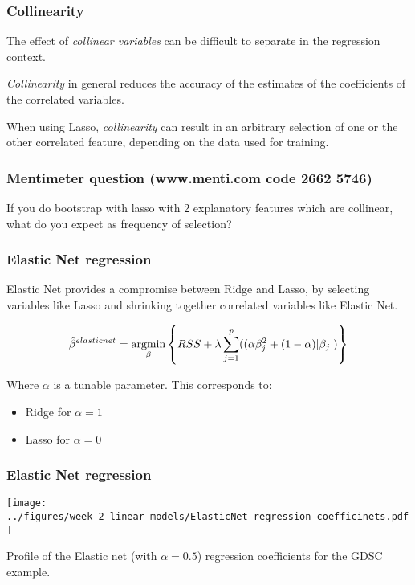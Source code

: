 \documentclass[notes]{beamer}          %
\newcommand{\argmin}{\operatornamewithlimits{argmin}}
\begin{document}
\begin{frame}
\frametitle{Collinearity}
The effect of \textit{collinear variables} can be difficult to separate in the regression context.

\vspace{5mm} 

\textit{Collinearity} in general reduces the accuracy of the estimates of the coefficients of the correlated variables.

\vspace{5mm} 

When using Lasso, \textit{collinearity} can result in an arbitrary selection of one or the other correlated feature, depending on the data used for training.
\end{frame}

\begin{frame}
\frametitle{Mentimeter question (www.menti.com code 2662 5746)}

If you do bootstrap with lasso with 2 explanatory features which are collinear, what do you expect as frequency of selection?

\end{frame}

\begin{frame}
\frametitle{Elastic Net regression}

Elastic Net provides a compromise between Ridge and Lasso, by selecting variables like Lasso and shrinking together correlated variables like Elastic Net.


\begin{equation*}
    \hat{\beta}^{elastic net} =  \argmin_{\beta} \left\{ RSS + \lambda \sum_{j=1}^p ((\alpha \beta_j^2 + (1-\alpha)| \beta_j |) \right\}
\end{equation*}

Where $\alpha$ is a tunable parameter. This corresponds to:

\begin{itemize}
    \item Ridge for $\alpha=1$
    \item Lasso for $\alpha=0$
\end{itemize}

\end{frame}

\begin{frame}
\frametitle{Elastic Net regression}

\begin{center}
\texttt{[image: ../figures/week\_2\_linear\_models/ElasticNet\_regression\_coefficinets.pdf]}
\end{center}

Profile of the Elastic net (with $\alpha=0.5$) regression coefficients for the GDSC example.

\end{frame}
\end{document}
